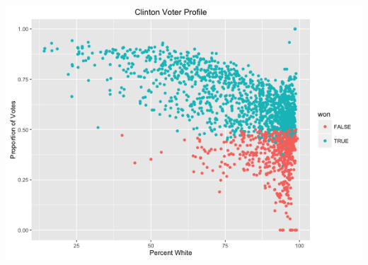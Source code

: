 \documentclass[11pt]{article}
\begin{document}
\includegraphics[scale=0.38]{../exploratory_plots/Clinton_White.png}\\
\end{document}
